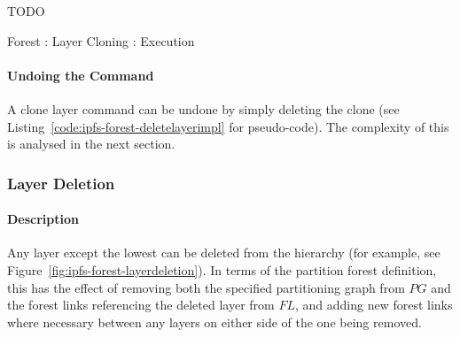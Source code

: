 TODO


\begin{stulisting}[p]
\caption{Forest : Layer Cloning : Execution}
\label{code:ipfs-forest-clonelayerimpl}

\end{stulisting}

\paragraph{Undoing the Command}

A clone layer command can be undone by simply deleting the clone (see Listing~\ref{code:ipfs-forest-deletelayerimpl} for pseudo-code). The complexity of this is analysed in the next section.

\afterpage{\clearpage}
\newpage

\subsubsection{Layer Deletion}

\paragraph{Description}

Any layer except the lowest can be deleted from the hierarchy (for example, see Figure~\ref{fig:ipfs-forest-layerdeletion}). In terms of the partition forest definition, this has the effect of removing both the specified partitioning graph from $\textit{PG}$ and the forest links referencing the deleted layer from $\textit{FL}$, and adding new forest links where necessary between any layers on either side of the one being removed.

